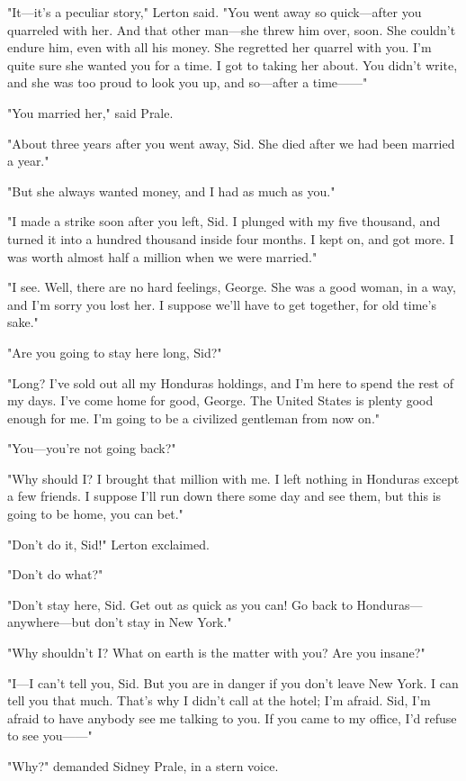 \documentclass{novel}
\begin{document}
"It---it's a peculiar story," Lerton said. "You went away so quick---after you quarreled with her. And that other man---she threw him over, soon. She couldn't endure him, even with all his money. She regretted her quarrel with you. I'm quite sure she wanted you for a time. I got to taking her about. You didn't write, and she was too proud to look you up, and so---after a time------"

"You married her," said Prale.

"About three years after you went away, Sid. She died after we had been married a year."

"But she always wanted money, and I had as much as you."

"I made a strike soon after you left, Sid. I plunged with my five thousand, and turned it into a hundred thousand inside four months. I kept on, and got more. I was worth almost half a million when we were married."

"I see. Well, there are no hard feelings, George. She was a good woman, in a way, and I'm sorry you lost her. I suppose we'll have to get together, for old time's sake."

"Are you going to stay here long, Sid?"

"Long? I've sold out all my Honduras holdings, and I'm here to spend the rest of my days. I've come home for good, George. The United States is plenty good enough for me. I'm going to be a civilized gentleman from now on."

"You---you're not going back?"

"Why should I? I brought that million with me. I left nothing in Honduras except a few friends. I suppose I'll run down there some day and see them, but this is going to be home, you can bet."

"Don't do it, Sid!" Lerton exclaimed.

"Don't do what?"

"Don't stay here, Sid. Get out as quick as you can! Go back to Honduras---anywhere---but don't stay in New York."

"Why shouldn't I? What on earth is the matter with you? Are you insane?"

"I---I can't tell you, Sid. But you are in danger if you don't leave New York. I can tell you that much. That's why I didn't call at the hotel; I'm afraid. Sid, I'm afraid to have anybody see me talking to you. If you came to my office, I'd refuse to see you------"

"Why?" demanded Sidney Prale, in a stern voice.
\end{document}
